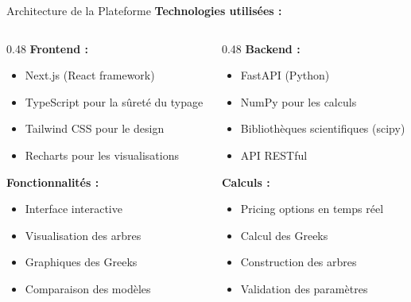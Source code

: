 \documentclass[aspectratio=169, 10pt]{beamer}
\begin{document}
\begin{frame}{Architecture de la Plateforme}
    \textbf{Technologies utilisées :}
    
    \vspace{0.3cm}
    \begin{columns}[T]
        \begin{column}{0.48\textwidth}
            \textbf{Frontend :}
            \begin{itemize}
                \item Next.js (React framework)
                \item TypeScript pour la sûreté du typage
                \item Tailwind CSS pour le design
                \item Recharts pour les visualisations
            \end{itemize}
            
            \vspace{0.3cm}
            \textbf{Fonctionnalités :}
            \begin{itemize}
                \item Interface interactive
                \item Visualisation des arbres
                \item Graphiques des Greeks
                \item Comparaison des modèles
            \end{itemize}
        \end{column}
        \begin{column}{0.48\textwidth}
            \textbf{Backend :}
            \begin{itemize}
                \item FastAPI (Python)
                \item NumPy pour les calculs
                \item Bibliothèques scientifiques (scipy)
                \item API RESTful
            \end{itemize}
            
            \vspace{0.3cm}
            \textbf{Calculs :}
            \begin{itemize}
                \item Pricing options en temps réel
                \item Calcul des Greeks
                \item Construction des arbres
                \item Validation des paramètres
            \end{itemize}
        \end{column}
    \end{columns}
    

\end{frame}
\end{document}
